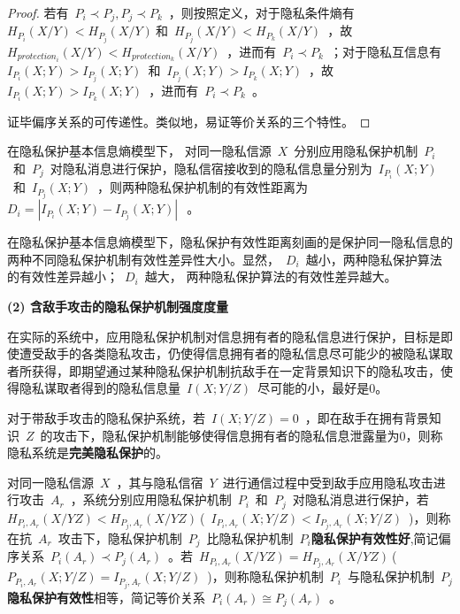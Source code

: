 \begin{proof}
	若有~$P_{i}\prec P_{j},P_{j}\prec P_{k}$~，则按照定义，对于隐私条件熵有~$H_{P_{i}}(X/Y)< H_{P_{j}}(X/Y)~$和~$H_{P_{j}}(X/Y)< H_{P_{k}}(X/Y)$~，故~$H_{protection_{i}}(X/Y)< H_{protection_{k}}(X/Y)$~，进而有~$P_{i}\prec P_{k}$~；对于隐私互信息有~$I_{P_{i}}(X;Y)>I_{P_{j}}(X;Y)$~和~$I_{P_{j}}(X;Y)>I_{P_{k}}(X;Y)$~，故~$I_{P_{i}}(X;Y)>I_{P_{k}}(X;Y)$~，进而有~$P_{i}\prec P_{k}$~。
	
	证毕偏序关系的可传递性。类似地，易证等价关系的三个特性。
\end{proof}


\begin{definition}[隐私保护有效性距离]
	\label{def:privacy-preserving-distance} 
	在隐私保护基本信息熵模型下， 对同一隐私信源~$X$~分别应用隐私保护机制~$P_{i}$~和~$P_{j}$~对隐私消息进行保护，隐私信宿接收到的隐私信息量分别为~$I_{P_{i}}(X;Y)$~和~$I_{P_{j}}(X;Y)$~，则两种隐私保护机制的有效性距离为~$D_{i}=\left | I_{P_{i}}(X;Y)-I_{P_{j}}(X;Y) \right |~$~。
\end{definition}

在隐私保护基本信息熵模型下，隐私保护有效性距离刻画的是保护同一隐私信息的两种不同隐私保护机制有效性差异性大小。显然，~$D_{i}$~越小，两种隐私保护算法的有效性差异越小；~$D_{i}$~越大， 两种隐私保护算法的有效性差异越大。

\textbf{(2) 含敌手攻击的隐私保护机制强度度量}

在实际的系统中，应用隐私保护机制对信息拥有者的隐私信息进行保护，目标是即使遭受敌手的各类隐私攻击，仍使得信息拥有者的隐私信息尽可能少的被隐私谋取者所获得，即期望通过某种隐私保护机制抗敌手在一定背景知识下的隐私攻击，使得隐私谋取者得到的隐私信息量~$I(X;Y/Z)$~尽可能的小，最好是0。

\begin{definition}
	\label{def:perfect-privacy-preserving}
	 对于带敌手攻击的隐私保护系统，若~$I(X;Y/Z)=0$~，即在敌手在拥有背景知识~$Z$~的攻击下，隐私保护机制能够使得信息拥有者的隐私信息泄露量为0，则称隐私系统是\textbf{完美隐私保护}的。
\end{definition}


\begin{definition}
	\label{def:privacy-preserving-performance}
	对同一隐私信源~$X$~，其与隐私信宿~$Y$~进行通信过程中受到敌手应用隐私攻击进行攻击~$A_{r}$~，系统分别应用隐私保护机制~$P_{i}$~和~$P_{j}$~对隐私消息进行保护，若~$H_{P_{i},A_{r}}(X/YZ)<H_{P_{j},A_{r}}(X/YZ)~$(~$I_{P_{i},A_{r}}(X;Y/Z)<I_{P_{j},A_{r}}(X;Y/Z)$~)，则称在抗~$A_{r}$~攻击下，隐私保护机制~$P_{j}$~比隐私保护机制~$P_{i}$\textbf{隐私保护有效性好},简记偏序关系~$P_{i}(A_{r})\prec P_{j}(A_{r})$~。若~$H_{P_{i},A_{r}}(X/YZ)=H_{P_{j},A_{r}}(X/YZ)~$(~$P_{P_{i},A_{r}}(X;Y/Z)=I_{P_{j},A_{r}}(X;Y/Z)$~)，则称隐私保护机制~$P_{i}$~与隐私保护机制~$P_{j}$\textbf{隐私保护有效性}相等，简记等价关系~$P_{i}(A_{r})\cong P_{j}(A_{r})$~。
\end{definition}

